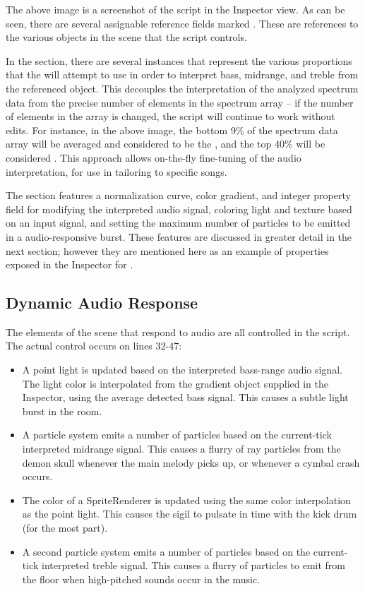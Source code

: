 \documentclass[12pt]{article}
\begin{document}
The above image is a screenshot of the  script in the Inspector view. As can be seen, there are several assignable reference fields marked . These are references to the various objects in the scene that the script controls.

In the  section, there are several  instances that represent the various proportions that the  will attempt to use in order to interpret bass, midrange, and treble from the  referenced object. This decouples the interpretation of the analyzed spectrum data from the precise number of elements in the spectrum array -- if the number of elements in the array is changed, the script will continue to work without edits. For instance, in the above image, the bottom 9\% of the spectrum data array will be averaged and considered to be the , and the top 40\% will be considered . This approach allows on-the-fly fine-tuning of the audio interpretation, for use in tailoring to specific songs.

The  section features a normalization curve, color gradient, and integer property field for modifying the interpreted audio signal, coloring light and texture based on an input signal, and setting the maximum number of particles to be emitted in a audio-responsive burst. These features are discussed in greater detail in the next section; however they are mentioned here as an example of properties exposed in the Inspector for .

\subsection*{Dynamic Audio Response}
The elements of the scene that respond to audio are all controlled in the  script. The actual control occurs on lines 32-47:
\begin{itemize}
	\item A point light is updated based on the interpreted bass-range audio signal. The light color is interpolated from the gradient object supplied in the Inspector, using the average detected bass signal. This causes a subtle light burst in the room.
	\item A particle system emits a number of particles based on the current-tick interpreted midrange signal. This causes a flurry of ray particles from the demon skull whenever the main melody picks up, or whenever a cymbal crash occurs.
	\item The color of a SpriteRenderer is updated using the same color interpolation as the point light. This causes the sigil to pulsate in time with the kick drum (for the most part).
	\item A second particle system emits a number of particles based on the current-tick interpreted treble signal. This causes a flurry of particles to emit from the floor when high-pitched sounds occur in the music.
\end{itemize}
\end{document}
